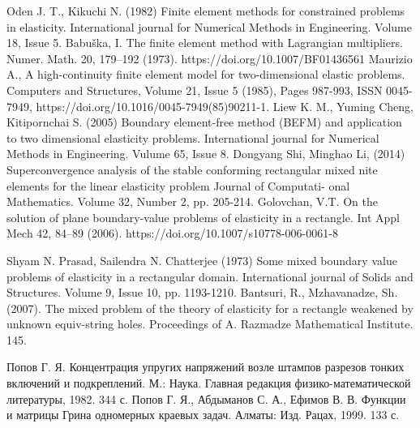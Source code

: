 \documentclass[a4paper,14pt]{extarticle}
\numberwithin{equation}{section}
\begin{document}
\begin{thebibliography}{1}
    Oden J. T., Kikuchi N. (1982) Finite element methods for constrained problems in elasticity. International journal for Numerical Methods in Engineering. Volume 18, Issue 5.
    Babuška, I. The finite element method with Lagrangian multipliers. Numer. Math. 20, 179–192 (1973). https://doi.org/10.1007/BF01436561
    Maurizio A., A high-continuity finite element model for two-dimensional elastic problems. Computers and Structures, Volume 21, Issue 5 (1985), Pages 987-993, ISSN 0045-7949, https://doi.org/10.1016/0045-7949(85)90211-1.
    Liew K. M., Yuming Cheng, Kitipornchai S. (2005) Boundary element-free method (BEFM) and application to two dimensional elasticity problems. International journal for Numerical Methods in Engineering. Vulume 65, Issue 8.
    Dongyang Shi, Minghao Li, (2014) Superconvergence analysis of the stable conforming rectangular mixed nite elements for the linear elasticity problem Journal of Computati- onal Mathematics. Volume 32, Number 2, pp. 205-214.
    Golovchan, V.T. On the solution of plane boundary-value problems of elasticity in a rectangle. Int Appl Mech 42, 84–89 (2006). https://doi.org/10.1007/s10778-006-0061-8
    
    Shyam N. Prasad, Sailendra N. Chatterjee (1973) Some mixed boundary value problems of elasticity in a rectangular domain. International journal of Solids and Structures. Volume 9, Issue 10, pp. 1193-1210.
    Bantsuri, R., Mzhavanadze, Sh. (2007). The mixed problem of the theory of elasticity for a rectangle weakened by unknown equiv-string holes. Proceedings of A. Razmadze Mathematical Institute. 145. 
    
    Попов Г. Я. Концентрация упругих напряжений возле штампов разрезов тонких включений и подкреплений. М.: Наука. Главная редакция физико-математической литературы, 1982. 344 с.
    Попов Г. Я., Абдыманов С. А., Ефимов В. В. Функции и матрицы Грина одномерных краевых задач. Алматы: Изд. Рацах, 1999. 133 с.


\end{thebibliography}
\end{document}

